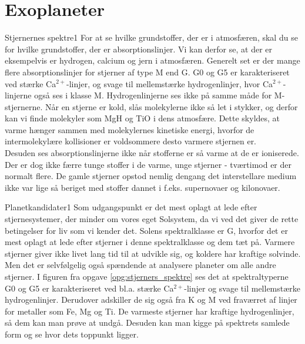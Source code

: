 \chapter{Exoplaneter}
%
%
\begin{opgave}{Stjernernes spektre}{1} \label{opg:stjerners_spektre}
\opg For at se hvilke grundstoffer, der er i atmosfæren, skal du se for hvilke grundstoffer, der er absorptionslinjer. Vi kan derfor se, at der er eksempelvis er hydrogen, calcium og jern i atmosfæren.
\opg Generelt set er der mange flere absorptionslinjer for stjerner af type M end G. G0 og G5 er karakteriseret ved stærke Ca$^{2+}$-linjer, og svage til mellemstærke hydrogenlinjer, hvor Ca$^{2+}$-linjerne også ses i klasse M. Hydrogenlinjerne ses ikke på samme måde for M-stjernerne.
\opg Når en stjerne er kold, slås molekylerne ikke så let i stykker, og derfor kan vi finde molekyler som MgH og TiO i dens atmosfære. Dette skyldes, at varme hænger sammen med molekylernes kinetiske energi, hvorfor de intermolekylære kollisioner er voldsommere desto varmere stjernen er.  \\
Desuden ses absorptionslinjerne ikke når stofferne er så varme at de er ioniserede. \\
Der er dog ikke færre tunge stoffer i de varme, unge stjerner - tværtimod er der normalt flere. De gamle stjerner opstod nemlig dengang det interstellare medium ikke var lige så beriget med stoffer dannet i f.eks. supernovaer og kilonovaer.
\end{opgave}
%
%
\begin{opgave}{Planetkandidater}{1}
\opg Som udgangspunkt er det mest oplagt at lede efter stjernesystemer, der minder om vores eget Solsystem, da vi ved det giver de rette betingelser for liv som vi kender det. Solens spektralklasse er G, hvorfor det er mest oplagt at lede efter stjerner i denne spektralklasse og dem tæt på. Varmere stjerner giver ikke livet lang tid til at udvikle sig, og koldere har kraftige solvinde. Men det er selvfølgelig også spændende at analysere planeter om alle andre stjerner. 
\opg I figuren fra opgave \ref{opg:stjerners_spektre} ses det at spektraltyperne G0 og G5 er karakteriseret ved bl.a. stærke Ca$^{2+}$-linjer og svage til mellemstærke hydrogenlinjer. Derudover adskiller de sig også fra K og M ved fraværret af linjer for metaller som Fe, Mg og Ti. De varmeste stjerner har kraftige hydrogenlinjer, så dem kan man prøve at undgå. Desuden kan man kigge på spektrets samlede form og se hvor dets toppunkt ligger.
\end{opgave}
%
%
